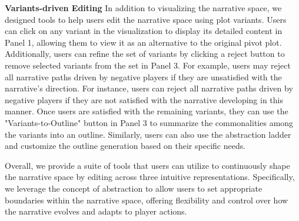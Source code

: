 
\noindent\textbf{Variants-driven Editing} In addition to visualizing the narrative space, we designed tools to help users edit the narrative space using plot variants. Users can click on any variant in the visualization to display its detailed content in Panel 1, allowing them to view it as an alternative to the original pivot plot. Additionally, users can refine the set of variants by clicking a reject button to remove selected variants from the set in Panel 3. For example, users may reject all narrative paths driven by negative players if they are unsatisfied with the narrative's direction. For instance, users can reject all narrative paths driven by negative players if they are not satisfied with the narrative developing in this manner. Once users are satisfied with the remaining variants, they can use the "Variants-to-Outline" button in Panel 3 to summarize the commonalities among the variants into an outline. Similarly, users can also use the abstraction ladder and customize the outline generation based on their specific needs.


Overall, we provide a suite of tools that users can utilize to continuously shape the narrative space by editing across three intuitive representations. Specifically, we leverage the concept of abstraction to allow users to set appropriate boundaries within the narrative space, offering flexibility and control over how the narrative evolves and adapts to player actions.


